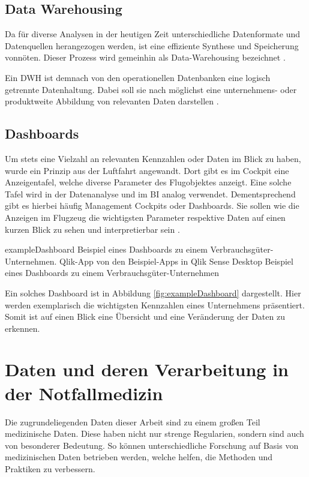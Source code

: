 \subsection{Data Warehousing}
\label{sub:warehouse}
Da für diverse Analysen in der heutigen Zeit unterschiedliche Datenformate und Datenquellen herangezogen werden, ist eine effiziente Synthese und Speicherung vonnöten.
Dieser Prozess wird gemeinhin als \glqq Data-Warehousing\grqq{} bezeichnet \cite[S.7]{Gabriel.2011}.

Ein \gls{DWH} ist demnach von den operationellen Datenbanken eine logisch getrennte Datenhaltung.
Dabei soll sie nach \cite[S.6]{Mucksch.2000} möglichst eine unternehmens- oder produktweite Abbildung von relevanten Daten darstellen \cite{Kemper.2004}.




\subsection{Dashboards}
Um stets eine Vielzahl an relevanten Kennzahlen oder Daten im Blick zu haben, wurde ein Prinzip aus der Luftfahrt angewandt.
Dort gibt es im Cockpit eine Anzeigentafel, welche diverse Parameter des Flugobjektes anzeigt.
Eine solche Tafel wird in der Datenanalyse und im \gls{BI} analog verwendet.
Dementsprechend gibt es hierbei häufig \glqq Management Cockpits\grqq{} oder \glqq Dashboards\grqq.
Sie sollen wie die Anzeigen im Flugzeug die wichtigsten Parameter respektive Daten auf einen kurzen Blick zu sehen und interpretierbar sein \cite[S.18]{Engels.2015}.

\bildbreit
{exampleDashboard}
{Beispiel eines Dashboards zu einem Verbrauchsgüter-Unternehmen. Qlik-App von den Beispiel-Apps in Qlik Sense Desktop}
{Beispiel eines Dashboards zu einem Verbrauchsgüter-Unternehmen}

Ein solches Dashboard ist in Abbildung \ref{fig:exampleDashboard} dargestellt.
Hier werden exemplarisch die wichtigsten Kennzahlen eines Unternehmens präsentiert.
Somit ist auf einen Blick eine Übersicht und eine Veränderung der Daten zu erkennen.


\section{Daten und deren Verarbeitung in der Notfallmedizin} %
Die zugrundeliegenden Daten dieser Arbeit sind zu einem großen Teil medizinische Daten.
Diese haben nicht nur strenge Regularien, sondern sind auch von besonderer Bedeutung.
So können unterschiedliche Forschung auf Basis von medizinischen Daten betrieben werden, welche helfen, die Methoden und Praktiken zu verbessern.

